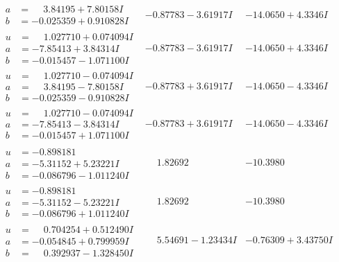 \documentclass[1p]{elsarticle_modified}
\theoremstyle{definition}
\begin{document}
$$\begin{array}{c|c|c}
\begin{aligned}
a &= \phantom{-}3.84195 + 7.80158 I \\
b &= -0.025359 + 0.910828 I\end{aligned}
 & -0.87783 - 3.61917 I & -14.0650 + 4.3346 I \\ \hline\begin{aligned}
u &= \phantom{-}1.027710 + 0.074094 I \\
a &= -7.85413 + 3.84314 I \\
b &= -0.015457 - 1.071100 I\end{aligned}
 & -0.87783 - 3.61917 I & -14.0650 + 4.3346 I \\ \hline\begin{aligned}
u &= \phantom{-}1.027710 - 0.074094 I \\
a &= \phantom{-}3.84195 - 7.80158 I \\
b &= -0.025359 - 0.910828 I\end{aligned}
 & -0.87783 + 3.61917 I & -14.0650 - 4.3346 I \\ \hline\begin{aligned}
u &= \phantom{-}1.027710 - 0.074094 I \\
a &= -7.85413 - 3.84314 I \\
b &= -0.015457 + 1.071100 I\end{aligned}
 & -0.87783 + 3.61917 I & -14.0650 - 4.3346 I \\ \hline\begin{aligned}
u &= -0.898181\phantom{ +0.000000I} \\
a &= -5.31152 + 5.23221 I \\
b &= -0.086796 - 1.011240 I\end{aligned}
 & \phantom{-}1.82692\phantom{ +0.000000I} & -10.3980\phantom{ +0.000000I} \\ \hline\begin{aligned}
u &= -0.898181\phantom{ +0.000000I} \\
a &= -5.31152 - 5.23221 I \\
b &= -0.086796 + 1.011240 I\end{aligned}
 & \phantom{-}1.82692\phantom{ +0.000000I} & -10.3980\phantom{ +0.000000I} \\ \hline\begin{aligned}
u &= \phantom{-}0.704254 + 0.512490 I \\
a &= -0.054845 + 0.799959 I \\
b &= \phantom{-}0.392937 - 1.328450 I\end{aligned}
 & \phantom{-}5.54691 - 1.23434 I & -0.76309 + 3.43750 I \\ \hline\begin{aligned}

\end{aligned}
\end{array}$$
\end{document}
